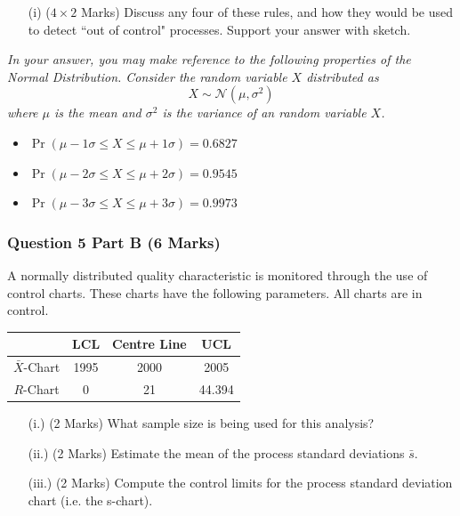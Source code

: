 \documentclass[a4paper,12pt]{article}
\begin{document}
\begin{itemize}
	\item[(i)] ($4 \times 2$ Marks) Discuss any four of these rules, and how they would be used to detect ``out of control" processes. Support your answer with sketch.
\end{itemize}

\bigskip 
\begin{framed}
	\noindent \textit{In your answer, you may make reference to the following properties of the Normal Distribution. Consider the random variable $X$ distributed as
		\[X \sim \mathcal{N}(\mu,\sigma^2)\]
		where $\mu$ is the mean and $\sigma^2$ is the variance of an random variable $X$.}
	\begin{itemize}
		\item $\Pr( \mu - 1\sigma \leq X \leq \mu + 1\sigma ) = 0.6827$
		\item $\Pr( \mu - 2\sigma \leq X \leq \mu + 2\sigma ) = 0.9545$
		\item $\Pr( \mu - 3\sigma \leq X \leq \mu + 3\sigma )= 0.9973$
		
	\end{itemize}
\end{framed}
\newpage

\subsubsection*{Question 5 Part B (6 Marks)}
A normally distributed quality characteristic is monitored through the use of control charts. These charts have the following parameters. All charts are in control.
\begin{center}
	\begin{tabular}{|c|c|c|c|}
		\hline  & LCL & Centre Line & UCL \\
		\hline $\bar{X}$-Chart & 1995 & 2000 & 2005 \\
		\hline $R$-Chart & 0 & 21 & 44.394 \\ \hline
	\end{tabular}
\end{center}

\begin{itemize}
	\item[(i.)] (2 Marks) What sample size is being used for this analysis?
	\item[(ii.)] (2 Marks) Estimate the mean of the process standard deviations $\bar{s}$.
	\item[(iii.)] (2 Marks) Compute the control limits for the process standard deviation chart (i.e. the s-chart).
\end{itemize}
\end{document}
